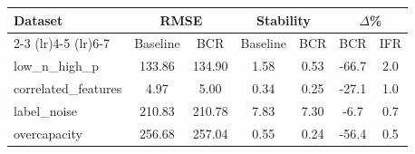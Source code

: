 \begin{tabular}{lcccccc}
\toprule
Dataset & \multicolumn{2}{c}{RMSE} & \multicolumn{2}{c}{Stability} & \multicolumn{2}{c}{$\Delta$\%} \\
\cmidrule(lr){2-3} \cmidrule(lr){4-5} \cmidrule(lr){6-7}
 & Baseline & BCR & Baseline & BCR & BCR & IFR \\
\midrule
low_n_high_p & 133.86 & 134.90 & 1.58 & 0.53 & -66.7 & 2.0 \\
correlated_features & 4.97 & 5.00 & 0.34 & 0.25 & -27.1 & 1.0 \\
label_noise & 210.83 & 210.78 & 7.83 & 7.30 & -6.7 & 0.7 \\
overcapacity & 256.68 & 257.04 & 0.55 & 0.24 & -56.4 & 0.5 \\
\bottomrule
\end{tabular}
